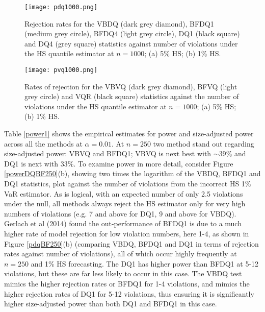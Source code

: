 \documentclass[12pt,epsf]{article}
\begin{document}
\begin{figure}[thp]
     \centering
      \texttt{[image: pdq1000.png]}
\caption{\label{pdq1000} Rejection rates for the VBDQ (dark grey diamond), BFDQ1 (medium grey circle), BFDQ4 (light grey circle),
DQ1 (black square) and DQ4 (grey square) statistics against number of violations under the HS quantile estimator at $n=1000$;
(a) 5\% HS; (b) 1\% HS.}
\end{figure}

\begin{figure}%
     \centering
      \texttt{[image: pvq1000.png]}
\caption{\label{pvq1000} Rates of rejection for the VBVQ (dark grey diamond), BFVQ (light grey circle) and VQR (black square) statistics against the
number of violations under the HS quantile estimator at $n=1000$; (a) 5\% HS; (b) 1\% HS.}
\end{figure}

Table \ref{power1} shows the empirical estimates for power and size-adjusted power across all the methods
at $\alpha=0.01$. At $n=250$ two method stand out regarding size-adjusted power: VBVQ and BFDQ1;
VBVQ is next best with $\sim 39\%$ and DQ1 is next with $33\%$. To examine power in more detail, consider
Figure \ref{powerDQBF250}(b), showing two times the logarithm of the VBDQ, BFDQ1 and DQ1 statistics, plot against the number of
violations from the incorrect HS 1\% VaR estimator. As is logical, with an expected number of only 2.5 violations under the null,
all methods always reject the HS estimator only for very high numbers of violations (e.g. 7 and above for DQ1, 9 and above for VBDQ).
Gerlach et al (2014) found the out-performance of BFDQ1 is due to a much higher rate of model rejection for low violation numbers,
here 1-4, as shown in Figure \ref{pdqBF250}(b) (comparing VBDQ, BFDQ1 and DQ1 in terms of rejection rates against number of violations),
all of which occur highly frequently at $n=250$ and 1\% HS forecasting. The DQ1 has higher power than BFDQ1 at 5-12 violations,
but these are far less likely to occur in this case. The VBDQ test mimics the higher rejection rates or BFDQ1 for 1-4 violations, and
mimics the higher rejection rates of DQ1 for 5-12 violations, thus ensuring it is significantly higher size-adjusted power than
both DQ1 and BFDQ1 in this case.
\end{document}
